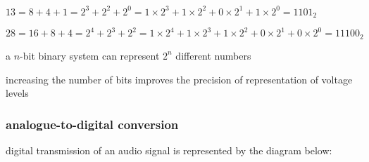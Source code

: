 
\sol $13 = 8 + 4 + 1 = 2^3 + 2^2 + 2^0 = 1\times2^3 + 1\times2^2 + 0\times2^1 + 1\times2^0 = 1101_2$

$28 = 16 + 8 + 4 = 2^4 + 2^3 + 2^2 = 1\times 2^4 + 1\times2^3 + 1\times2^2 + 0\times2^1 + 0\times2^0 = 11100_2$ \eoe

\cmt a $n$-bit binary system can represent $2^n$ different numbers

increasing the number of bits improves the precision of representation of voltage levels

\subsubsection{analogue-to-digital conversion}

digital transmission of an audio signal is represented by the diagram below:

